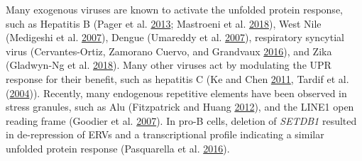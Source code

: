 \documentclass[onehalf,12pt]{beavtex}
\begin{document}
  Many exogenous viruses are known to activate the unfolded protein
  response, such as Hepatitis B (Pager et al.
  \protect\hyperlink{ref-PagerModulationhepatitisvirus2013}{2013};
  Mastroeni et al.
  \protect\hyperlink{ref-MastroeniLasercapturedmicrogliaAlzheimer2018}{2018}),
  West Nile (Medigeshi et al.
  \protect\hyperlink{ref-MedigeshiWestNilevirus2007}{2007}), Dengue
  (Umareddy et al.
  \protect\hyperlink{ref-UmareddyDenguevirusserotype2007}{2007}),
  respiratory syncytial virus (Cervantes-Ortiz, Zamorano Cuervo, and
  Grandvaux
  \protect\hyperlink{ref-Cervantes-OrtizRespiratorySyncytialVirus2016}{2016}),
  and Zika (Gladwyn-Ng et al.
  \protect\hyperlink{ref-Gladwyn-NgStressinducedunfoldedprotein2018}{2018}).
  Many other viruses act by modulating the UPR response for their benefit,
  such as hepatitis C (Ke and Chen
  \protect\hyperlink{ref-KeActivationunfoldedprotein2011}{2011}, Tardif et
  al. (\protect\hyperlink{ref-TardifHepatitisvirussuppresses2004}{2004})).
  Recently, many endogenous repetitive elements have been observed in
  stress granules, such as Alu (Fitzpatrick and Huang
  \protect\hyperlink{ref-FitzpatrickUTRlocatedinvertedAlu2012}{2012}), and
  the LINE1 open reading frame (Goodier et al.
  \protect\hyperlink{ref-GoodierLINE1ORF1Protein2007}{2007}). In pro-B
  cells, deletion of \emph{SETDB1} resulted in de-repression of ERVs and a
  transcriptional profile indicating a similar unfolded protein response
  (Pasquarella et al.
  \protect\hyperlink{ref-PasquarellaRetrotransposonderepressionleads2016a}{2016}).
  
\end{document}
